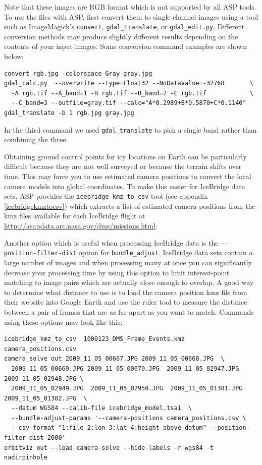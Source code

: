 Note that these images are RGB format which is not supported by all ASP tools.  
To use the files with ASP, first convert them to single channel images using 
a tool such as ImageMagick's \texttt{convert}, \texttt{gdal\_translate}, or 
\texttt{gdal\_edit.py}. Different conversion methods may produce slightly different
results depending on the contents of your input images.
Some conversion command examples are shown below:

\begin{verbatim}
convert rgb.jpg -colorspace Gray gray.jpg
gdal_calc.py  --overwrite --type=Float32 --NoDataValue=-32768       \
  -A rgb.tif --A_band=1 -B rgb.tif --B_band=2 -C rgb.tif            \
  --C_band=3 --outfile=gray.tif --calc="A*0.2989+B*0.5870+C*0.1140"
gdal_translate -b 1 rgb.jpg gray.jpg
\end{verbatim}

In the third command we used \texttt{gdal\_translate} to pick a single
band rather than combining the three.

Obtaining ground control points for icy locations on Earth can be particularly difficult because
they are not well surveyed or because the terrain shifts over time.
This may force you to use estimated camera positions
to convert the local camera models into global coordinates.
To make this easier for IceBridge data sets, ASP provides the
\texttt{icebridge\_kmz\_to\_csv} tool (see appendix \ref{icebridgekmztocsv})
which extracts a list of estimated camera positions from the kmz files available for each
IceBridge flight at \url{http://asapdata.arc.nasa.gov/dms/missions.html}.

Another option which is useful when processing IceBridge data is the
\texttt{-\/-position-filter-dist} option for \texttt{bundle\_adjust}.  IceBridge data sets contain
a large number of images and when processing many at once you can significantly decrease
your processing time by using this option to limit interest-point matching to image pairs
which are actually close enough to overlap.  A good way to determine what distance to use
is to load the camera position kmz file from their website into Google Earth and use the
ruler tool to measure the distance between a pair of frames that are as far apart as you
want to match. Commands using these options may look like this:

\begin{verbatim}
icebridge_kmz_to_csv  1000123_DMS_Frame_Events.kmz  camera_positions.csv
camera_solve out 2009_11_05_00667.JPG 2009_11_05_00668.JPG  \
  2009_11_05_00669.JPG 2009_11_05_00670.JPG  2009_11_05_02947.JPG 2009_11_05_02948.JPG \
  2009_11_05_02949.JPG  2009_11_05_02950.JPG  2009_11_05_01381.JPG 2009_11_05_01382.JPG  \
  --datum WGS84 --calib-file icebridge_model.tsai  \
  --bundle-adjust-params '--camera-positions camera_positions.csv \
  --csv-format "1:file 2:lon 3:lat 4:height_above_datum" --position-filter-dist 2000'
orbitviz out --load-camera-solve --hide-labels -r wgs84 -t nadirpinhole
\end{verbatim}

